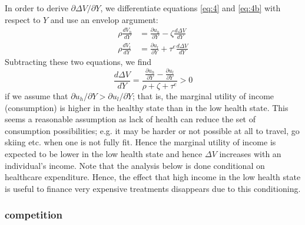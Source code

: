 \documentclass{article}
\begin{document}
In order to derive \(\partial \Delta V/ \partial Y\), we differentiate equations \eqref{eq:4} and \eqref{eq:4b} with respect to \(Y\) and use an envelop argument:
\begin{align}
\label{eq:25}
\rho \frac{dV_h}{dY} &= \frac{\partial u_h}{\partial Y} - \zeta \frac{d \Delta V}{d Y} \\
\label{eq:25b}
\rho \frac{dV_l}{dY} &= \frac{\partial u_l}{\partial Y} + \tau^e \frac{d \Delta V}{d Y}
\end{align}
Subtracting these two equations, we find
\begin{equation}
\label{eq:26}
\frac{d \Delta V}{dY} = \frac{\frac{\partial u_h}{\partial Y} - \frac{\partial u_l}{\partial Y}}{\rho + \zeta + \tau^e} > 0
\end{equation}
if we assume that \(\partial u_h/\partial Y > \partial u_l /\partial Y\); that is, the marginal utility of income (consumption) is higher in the healthy state than in the low health state. This seems a reasonable assumption as lack of health can reduce the set of consumption possibilities; e.g. it may be harder or not possible at all to travel, go skiing etc. when one is not fully fit. Hence the marginal utility of income is expected to be lower in the low health state and hence \(\Delta V\) increases with an individual's income. Note that the analysis below is done conditional on healthcare expenditure. Hence, the effect that high income in the low health state is useful to finance very expensive treatments disappears due to this conditioning.

\subsubsection{competition}
\label{sec:org843adb1}
\end{document}
